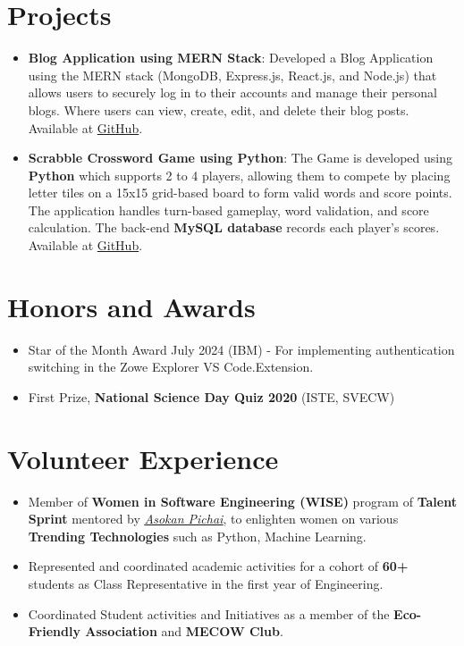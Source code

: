 \documentclass[a4paper,20pt]{article}
\newcommand{\resumeItem}[2]{
  \item\small{\textbf{#1}{: #2 \vspace{-2pt}}}
}
\newcommand{\resumeSubItem}[2]{\resumeItem{#1}{#2}\vspace{-3pt}}
\newcommand{\resumeSubHeadingListStart}{\begin{itemize}[leftmargin=*]}
\newcommand{\resumeSubHeadingListEnd}{\end{itemize}}
\begin{document}
\vspace{+5pt}
\section{Projects}
    \resumeSubHeadingListStart
        \resumeSubItem
            {Blog Application using MERN Stack}
            {Developed a Blog Application using the MERN stack (MongoDB, Express.js, React.js, and Node.js) that allows users to securely log in to their accounts and manage their personal blogs. Where users can view, create, edit, and delete their blog posts. Available at \href{https://github.com/SanthoshiBoyina/BlogApplication}{GitHub}.}
        \resumeSubItem
            {Scrabble Crossword Game using Python}
            {The Game is developed using \textbf{Python} which supports 2 to 4 players, allowing them to compete by placing letter tiles on a 15x15 grid-based board to form valid words and score points. The application handles turn-based gameplay, word validation, and score calculation. The back-end \textbf{MySQL database} records each player's scores. Available at \href{https://github.com/SanthoshiBoyina/Scrabble}{GitHub}.}
    \resumeSubHeadingListEnd

\vspace{+5pt}
\section{Honors and Awards}
    \begin{itemize}
        \item Star of the Month Award July 2024 (IBM) - For implementing authentication switching in the Zowe Explorer VS Code.Extension.
        \item First Prize, \textbf{National Science Day Quiz 2020} (ISTE, SVECW)
    \end{itemize}

\vspace{+5pt}
\section{Volunteer Experience}
\begin{itemize}
    \item {Member of \textbf{Women in Software Engineering (WISE)} program of \textbf{Talent Sprint} mentored by \href{https://www.linkedin.com/in/pasokan/}{\underline{\textit{Asokan Pichai}}}, to enlighten women on various \textbf{Trending Technologies} such as Python, Machine Learning.}
    \item {Represented and coordinated academic activities for a cohort of \textbf{60+} students as Class Representative in the first year of Engineering.}
    \item {Coordinated Student activities and Initiatives as a member of the \textbf{Eco-Friendly Association} and \textbf{MECOW Club}.}
    \end{itemize}
\end{document}
